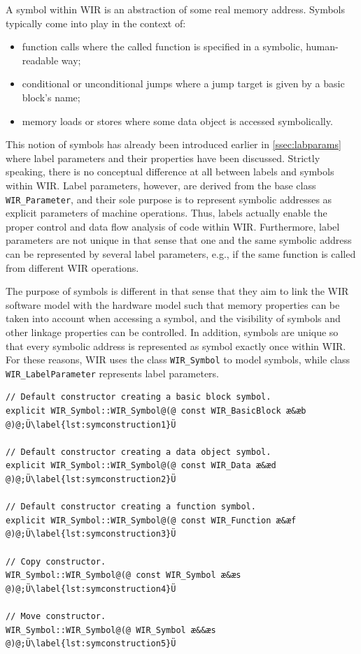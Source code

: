 A symbol within \gls{WIR} is an abstraction of some real memory address.
Symbols typically come into play in the context of:
\begin{itemize}
  \item function calls where the called function is specified in a symbolic, human-readable way;
  \item conditional or unconditional jumps where a jump target is given by a basic block's name;
  \item memory loads or stores where some data object is accessed symbolically.
\end{itemize}
This notion of symbols has already been introduced earlier in \cref{ssec:labparams} where label parameters and their properties have been discussed.
Strictly speaking, there is no conceptual difference at all between labels and symbols within \gls{WIR}.
Label parameters, however, are derived from the base class \texttt{WIR\_Parameter}, and their sole purpose is to represent symbolic addresses as explicit parameters of machine operations.
Thus, labels actually enable the proper control and data flow analysis of code within \gls{WIR}.
Furthermore, label parameters are not unique in that sense that one and the same symbolic address can be represented by several label parameters, e.g., if the same function is called from different \gls{WIR} operations.

The purpose of symbols is different in that sense that they aim to link the \gls{WIR} software model with the hardware model such that memory properties can be taken into account when accessing a symbol, and the visibility of symbols and other linkage properties can be controlled.
In addition, symbols are unique so that every symbolic address is represented as symbol exactly once within \gls{WIR}.
For these reasons, \gls{WIR} uses the class \texttt{WIR\_Symbol} to model symbols, while class \texttt{WIR\_LabelParameter} represents label parameters.

\begin{lstlisting}[style=code,float=t,caption={Constructors of Class \texttt{WIR\_Symbol}},label=lst:symconstruction]
// Default constructor creating a basic block symbol.
explicit WIR_Symbol::WIR_Symbol@(@ const WIR_BasicBlock æ&æb @)@;Ü\label{lst:symconstruction1}Ü

// Default constructor creating a data object symbol.
explicit WIR_Symbol::WIR_Symbol@(@ const WIR_Data æ&æd @)@;Ü\label{lst:symconstruction2}Ü

// Default constructor creating a function symbol.
explicit WIR_Symbol::WIR_Symbol@(@ const WIR_Function æ&æf @)@;Ü\label{lst:symconstruction3}Ü

// Copy constructor.
WIR_Symbol::WIR_Symbol@(@ const WIR_Symbol æ&æs @)@;Ü\label{lst:symconstruction4}Ü

// Move constructor.
WIR_Symbol::WIR_Symbol@(@ WIR_Symbol æ&&æs @)@;Ü\label{lst:symconstruction5}Ü
\end{lstlisting}

